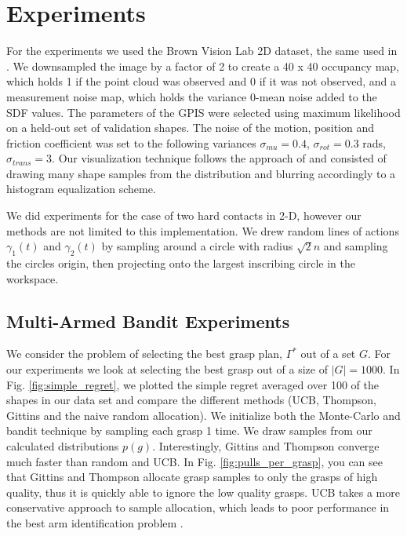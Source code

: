\documentclass[letterpaper, 10 pt, conference]{ieeeconf}  %
\begin{document}
\section{Experiments}
For the experiments we used the Brown Vision Lab 2D dataset, the same used in \cite{christopoulos2007handling}. We downsampled the image by a factor of 2 to create a 40 x 40 occupancy map, which holds 1 if the point cloud was observed and 0 if it was not observed, and a measurement noise map, which holds the variance 0-mean noise added to the SDF values. The parameters of the GPIS were selected using maximum likelihood on a held-out set of validation shapes. The noise of the motion, position and friction coefficient was set to the following variances $\sigma_{mu} = 0.4$, $\sigma_{rot} = 0.3$ rads,$\sigma_{trans} = 3$. Our visualization technique follows the approach of \cite{mahler2015opt} and consisted of drawing many shape samples from the distribution and blurring accordingly to a histogram equalization scheme. 

We did experiments for the case of two hard contacts in 2-D, however our methods are not limited to this implementation. We drew random lines of actions $\gamma_1(t)$ and $\gamma_2(t)$ by sampling around a circle with radius $\sqrt{2}n$ and sampling the circles origin, then projecting onto the largest inscribing circle in the workspace. 





\subsection{Multi-Armed Bandit Experiments}
We consider the problem of selecting the best grasp plan, $\Gamma^*$ out of a set $G$. For our experiments we look at selecting the best grasp out of a size of $|G| = 1000$. In Fig. \ref{fig:simple_regret}, we plotted the simple regret averaged over 100 of the shapes in our data set and compare the different methods (UCB, Thompson, Gittins and the naive random allocation). We initialize both the Monte-Carlo and bandit technique by sampling each grasp 1 time. We draw samples from our calculated distributions $p(g)$.  Interestingly, Gittins and Thompson converge much faster than random and UCB. In Fig. \ref{fig:pulls_per_grasp}, you can see that Gittins and Thompson allocate grasp samples to only the grasps of high quality, thus it is quickly able to ignore the low quality grasps. UCB takes a more conservative approach to sample allocation, which leads to poor performance in the best arm identification problem \cite{bubeck2009pure}.
\end{document}
